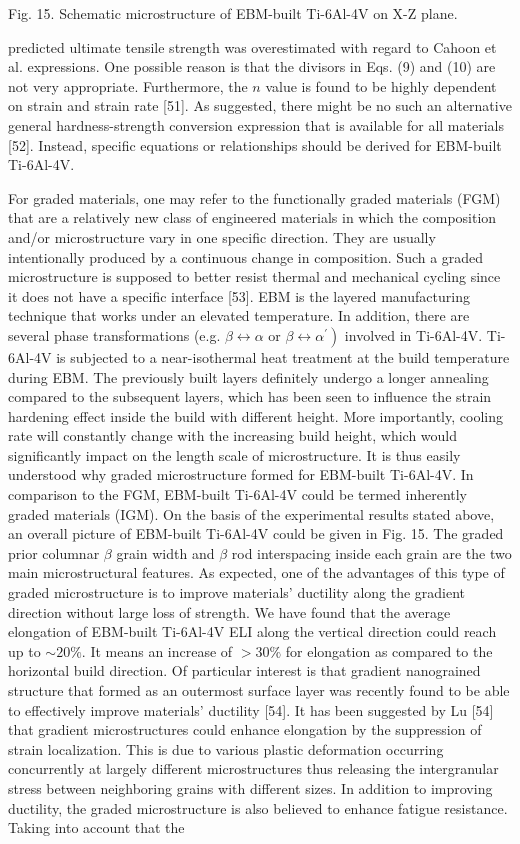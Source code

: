 \documentclass[10pt]{article}
\begin{document}
Fig. 15. Schematic microstructure of EBM-built Ti-6Al-4V on X-Z plane.

predicted ultimate tensile strength was overestimated with regard to Cahoon et al. expressions. One possible reason is that the divisors in Eqs. (9) and (10) are not very appropriate. Furthermore, the $n$ value is found to be highly dependent on strain and strain rate [51]. As suggested, there might be no such an alternative general hardness-strength conversion expression that is available for all materials [52]. Instead, specific equations or relationships should be derived for EBM-built Ti-6Al-4V.

For graded materials, one may refer to the functionally graded materials (FGM) that are a relatively new class of engineered materials in which the composition and/or microstructure vary in one specific direction. They are usually intentionally produced by a continuous change in composition. Such a graded microstructure is supposed to better resist thermal and mechanical cycling since it does not have a specific interface [53]. EBM is the layered manufacturing technique that works under an elevated temperature. In addition, there are several phase transformations (e.g. $\beta \leftrightarrow \alpha$ or $\left.\beta \leftrightarrow \alpha^{\prime}\right)$ involved in Ti-6Al-4V. Ti-6Al-4V is subjected to a near-isothermal heat treatment at the build temperature during EBM. The previously built layers definitely undergo a longer annealing compared to the subsequent layers, which has been seen to influence the strain hardening effect inside the build with different height. More importantly, cooling rate will constantly change with the increasing build height, which would significantly impact on the length scale of microstructure. It is thus easily understood why graded microstructure formed for EBM-built Ti-6Al-4V. In comparison to the FGM, EBM-built Ti-6Al-4V could be termed inherently graded materials (IGM). On the basis of the experimental results stated above, an overall picture of EBM-built Ti-6Al-4V could be given in Fig. 15. The graded prior columnar $\beta$ grain width and $\beta$ rod interspacing inside each grain are the two main microstructural features. As expected, one of the advantages of this type of graded microstructure is to improve materials' ductility along the gradient direction without large loss of strength. We have found that the average elongation of EBM-built Ti-6Al-4V ELI along the vertical direction could reach up to $\sim 20 \%$. It means an increase of $>30 \%$ for elongation as compared to the horizontal build direction. Of particular interest is that gradient nanograined structure that formed as an outermost surface layer was recently found to be able to effectively improve materials' ductility [54]. It has been suggested by Lu [54] that gradient microstructures could enhance elongation by the suppression of strain localization. This is due to various plastic deformation occurring concurrently at largely different microstructures thus releasing the intergranular stress between neighboring grains with different sizes. In addition to improving ductility, the graded microstructure is also believed to enhance fatigue resistance. Taking into account that the 
\end{document}
